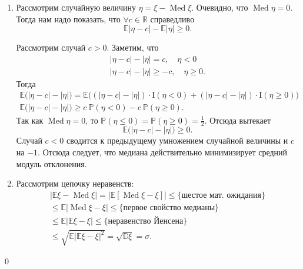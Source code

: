 \documentclass[oneside,final,14pt]{extreport}
\renewenvironment{proof}{{\bfseries Доказательство.}}{\qed}
\theoremstyle{plain}
\theoremstyle{definition}
\theoremstyle{named}
\begin{document}
\begin{proof}
    \begin{enumerate}
        \item Рассмотрим случайную величину $\eta = \xi - \operatorname{Med}\xi$. Очевидно, что $\operatorname{Med} \eta = 0$. Тогда нам надо показать, что $\forall c \in \mathbb{R} $ справедливо 
        \begin{equation*}
            \mathbb{E} |\eta - c| - \mathbb{E}|\eta| \geqslant 0.
        \end{equation*}
        
        Рассмотрим случай $c > 0$. Заметим, что 
        \begin{gather*}
            |\eta - c| - |\eta| = c, \quad \eta < 0 \\
            |\eta - c| - |\eta|  \geqslant -c, \quad \eta \geqslant 0.
        \end{gather*}
        Тогда
        \begin{gather*}
            \mathbb{E} \bigl(|\eta - c| - |\eta| \bigl) 
            = \mathbb{E} \bigl( (|\eta - c| - |\eta|) \cdot \mathrm{I}(\eta < 0) + (|\eta - c| - |\eta|) \cdot \mathrm{I}(\eta \geqslant 0) \bigl) \\
            \mathbb{E} \bigl( |\eta - c| - |\eta| \bigl) \geqslant c~\mathbb{P}(\eta < 0) - c~\mathbb{P}(\eta \geqslant 0).
        \end{gather*}
        Так как $\operatorname{Med}\eta = 0$, то $\mathbb{P}(\eta \leqslant 0) = \mathbb{P}(\eta \geqslant 0) = \frac{1}{2}$.
        Отсюда вытекает
        \begin{equation*}
            \mathbb{E}\bigl( |\eta - c| - |\eta| \bigl) \geqslant 0.
        \end{equation*}
        Случай $c < 0$ сводится к предыдущему умножением случайной величины и $c$ на $-1$. Отсюда следует, что медиана действительно минимизирует средний модуль отклонения.
        \item Рассмотрим цепочку неравенств:
        \begin{multline*}
            |\mathbb{E}\xi - \operatorname{Med}\xi| =
            |\mathbb{E}\left[ \operatorname{Med}\xi - \xi \right]| \leqslant 
            {\text{\{шестое мат. ожидания\}}} \\ \leqslant \mathbb{E} |\operatorname{Med}\xi - \xi|
            \leqslant {\text{\{первое свойство медианы\}}} \\ \leqslant
            \mathbb{E}| \mathbb{E}\xi - \xi| \leqslant
            {\text{\{неравенство Йенсена\}}} \\ 
            \leqslant
            \sqrt{\mathbb{E}| \mathbb{E}\xi - \xi|^2} = 
            \sqrt{\mathbb{D}\xi} = \sigma.
        \end{multline*}
    \end{enumerate}
\end{proof}
\end{document}

